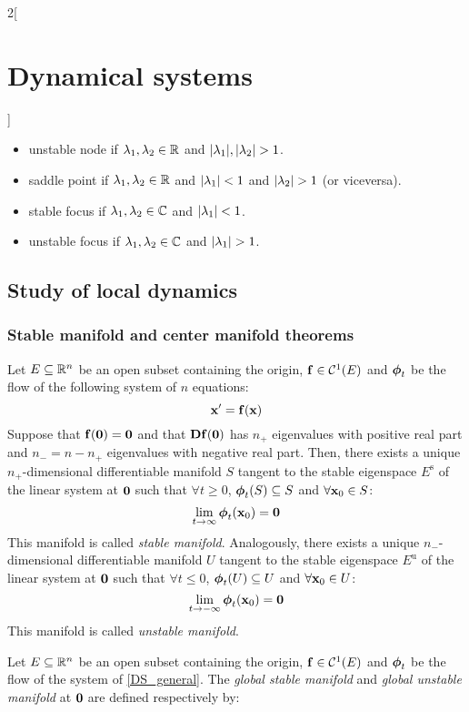 \documentclass[../../../main_math.tex]{subfiles}
\begin{document}
\begin{multicols}{2}[\section{Dynamical systems}]
\begin{theorem}
\begin{itemize}
      \item {unstable node} if $\lambda_1,\lambda_2\in\mathbb{R}$ and $\abs{\lambda_1},\abs{\lambda_2}>1$.
      \item {saddle point} if $\lambda_1,\lambda_2\in\mathbb{R}$ and $\abs{\lambda_1}<1$ and $\abs{\lambda_2}>1$ (or viceversa).
      \item {stable focus} if $\lambda_1,\lambda_2\in\mathbb{C}$ and $\abs{\lambda_1}<1$.
      \item {unstable focus} if $\lambda_1,\lambda_2\in\mathbb{C}$ and $\abs{\lambda_1}>1$.
    \end{itemize}
  \end{theorem}
  \subsection{Study of local dynamics}
  \subsubsection{Stable manifold and center manifold theorems}
  \begin{theorem}
    Let $E\subseteq\mathbb{R}^n$ be an open subset containing the origin, $\boldsymbol{\mathrm{f}}\in\mathcal{C}^1(E)$ and $\boldsymbol{\mathrm{\phi}}_t$ be the flow of the following system of $n$ equations:
    \begin{equation}\label{DS_general}
      \boldsymbol{\mathrm{x}}' =\boldsymbol{\mathrm{f}}(\boldsymbol{\mathrm{x}})
    \end{equation}
    Suppose that $\boldsymbol{\mathrm{f}}(\boldsymbol{\mathrm{0}})=\boldsymbol{\mathrm{0}}$ and that $\boldsymbol{\mathrm{Df}}(\boldsymbol{\mathrm{0}})$ has $n_+$ eigenvalues with positive real part and $n_-=n-n_+$ eigenvalues with negative real part. Then, there exists a unique $n_+$-dimensional differentiable manifold $S$ tangent to the stable eigenspace $E^\text{s}$ of the linear system at $\boldsymbol{\mathrm{0}}$ such that $\forall t\geq 0$, $\boldsymbol{\mathrm{\phi}}_t(S)\subseteq S$ and $\forall \boldsymbol{\mathrm{x}}_0\in S$: $$\lim_{t\to\infty}\boldsymbol{\mathrm{\phi}}_t(\boldsymbol{\mathrm{x}}_0)=\boldsymbol{\mathrm{0}}$$
    This manifold is called \emph{stable manifold}.
    Analogously, there exists a unique $n_-$-dimensional differentiable manifold $U$ tangent to the stable eigenspace $E^\text{u}$ of the linear system at $\boldsymbol{\mathrm{0}}$ such that $\forall t\leq 0$, $\boldsymbol{\mathrm{\phi}}_t(U)\subseteq U$ and $\forall \boldsymbol{\mathrm{x}}_0\in U$: $$\lim_{t\to-\infty}\boldsymbol{\mathrm{\phi}}_t(\boldsymbol{\mathrm{x}}_0)=\boldsymbol{\mathrm{0}}$$
    This manifold is called \emph{unstable manifold}.
  \end{theorem}
  \begin{definition}
    Let $E\subseteq\mathbb{R}^n$ be an open subset containing the origin, $\boldsymbol{\mathrm{f}}\in\mathcal{C}^1(E)$ and $\boldsymbol{\mathrm{\phi}}_t$ be the flow of the system of \cref{DS_general}. The \emph{global stable manifold} and \emph{global unstable manifold} at $\boldsymbol{\mathrm{0}}$ are defined respectively by:

\end{definition}
\end{multicols}
\end{document}
